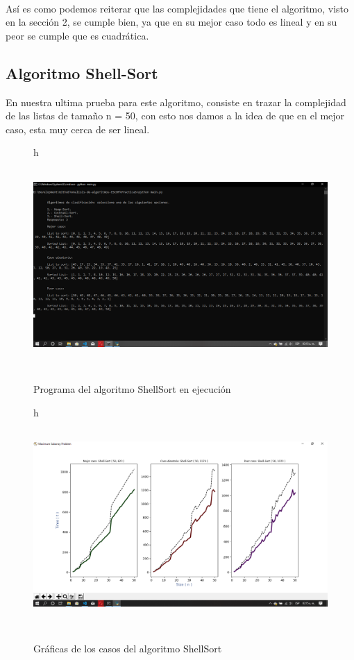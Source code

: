 \documentclass[12pt,twoside]{article}
\begin{document}
\\
As\'i es como podemos reiterar que las complejidades que tiene el algoritmo, visto en la secci\'on 2, se cumple bien, ya que en su mejor caso todo es lineal y en su peor se cumple que es cuadr\'atica.

\subsection{Algoritmo Shell-Sort}
En nuestra ultima prueba para este algoritmo, consiste en trazar la complejidad de las listas de tamaño n = 50, con esto nos damos a la idea de que en el mejor caso, esta muy cerca de ser lineal.

\begin{figure}{h}
    \centering
    \includegraphics[width=13cm, height=8cm]{ShellSortConsole.png}
    \caption{Programa del algoritmo ShellSort en ejecuci\'on}
    \label{fig:quick_program}
\end{figure}

\begin{figure}{h}
    \centering
    \includegraphics[width=13cm, height=8cm]{ShellSortGraph.png}
    \caption{Gr\'aficas de los casos del algoritmo ShellSort}
    \label{fig:quick_program}
\end{figure}
\\\\
\end{document}
